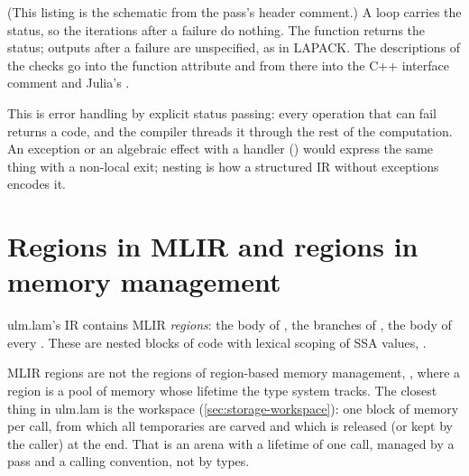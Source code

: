 (This listing is the schematic from the pass's header comment.) A loop
carries the status, so the iterations after a failure do nothing. The
function returns the status; outputs after a failure are unspecified, as in
LAPACK. The descriptions of the checks go into the function attribute
 and from there into the C++ interface comment and
Julia's .

\begin{theory}
This is error handling by explicit status passing: every operation that can
fail returns a code, and the compiler threads it through the rest of the
computation. An exception or an algebraic effect with a handler
() would express the same thing with a non-local exit;
 nesting is how a structured IR without exceptions encodes it.
\end{theory}

\section{Regions in MLIR and regions in memory management}
\label{sec:values-regions}

ulm.lam's IR contains MLIR \emph{regions}: the body of , the
branches of , the body of every . These are
nested blocks of code with lexical scoping of SSA values,
.

\begin{limit}
MLIR regions are not the regions of region-based memory management,
, where a region is a pool of memory
whose lifetime the type system tracks. The closest thing in ulm.lam is the
workspace (\cref{sec:storage-workspace}): one block of memory per call, from
which all temporaries are carved and which is released (or kept by the
caller) at the end. That is an arena with a lifetime of one call, managed
by a pass and a calling convention, not by types.
\end{limit}
